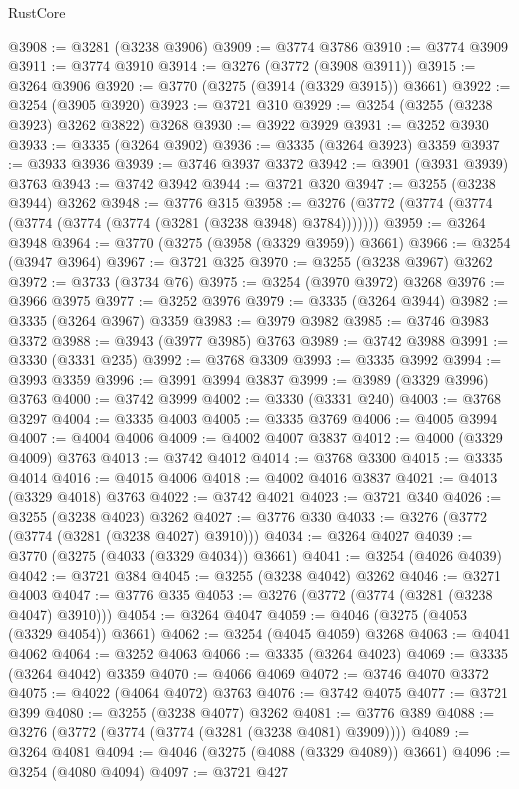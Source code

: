 \begin{lexlean}{RustCore}
\begin{coremodule}
@3908 := @3281 (@3238 @3906)
@3909 := @3774 @3786
@3910 := @3774 @3909
@3911 := @3774 @3910
@3914 := @3276 (@3772 (@3908 @3911))
@3915 := @3264 @3906
@3920 := @3770 (@3275 (@3914 (@3329 @3915)) @3661)
@3922 := @3254 (@3905 @3920)
@3923 := @3721 @310
@3929 := @3254 (@3255 (@3238 @3923) @3262 @3822) @3268
@3930 := @3922 @3929
@3931 := @3252 @3930
@3933 := @3335 (@3264 @3902)
@3936 := @3335 (@3264 @3923) @3359
@3937 := @3933 @3936
@3939 := @3746 @3937 @3372
@3942 := @3901 (@3931 @3939) @3763
@3943 := @3742 @3942
@3944 := @3721 @320
@3947 := @3255 (@3238 @3944) @3262
@3948 := @3776 @315
@3958 := @3276 (@3772 (@3774 (@3774 (@3774 (@3774 (@3774 (@3281 (@3238 @3948) @3784)))))))
@3959 := @3264 @3948
@3964 := @3770 (@3275 (@3958 (@3329 @3959)) @3661)
@3966 := @3254 (@3947 @3964)
@3967 := @3721 @325
@3970 := @3255 (@3238 @3967) @3262
@3972 := @3733 (@3734 @76)
@3975 := @3254 (@3970 @3972) @3268
@3976 := @3966 @3975
@3977 := @3252 @3976
@3979 := @3335 (@3264 @3944)
@3982 := @3335 (@3264 @3967) @3359
@3983 := @3979 @3982
@3985 := @3746 @3983 @3372
@3988 := @3943 (@3977 @3985) @3763
@3989 := @3742 @3988
@3991 := @3330 (@3331 @235)
@3992 := @3768 @3309
@3993 := @3335 @3992
@3994 := @3993 @3359
@3996 := @3991 @3994 @3837
@3999 := @3989 (@3329 @3996) @3763
@4000 := @3742 @3999
@4002 := @3330 (@3331 @240)
@4003 := @3768 @3297
@4004 := @3335 @4003
@4005 := @3335 @3769
@4006 := @4005 @3994
@4007 := @4004 @4006
@4009 := @4002 @4007 @3837
@4012 := @4000 (@3329 @4009) @3763
@4013 := @3742 @4012
@4014 := @3768 @3300
@4015 := @3335 @4014
@4016 := @4015 @4006
@4018 := @4002 @4016 @3837
@4021 := @4013 (@3329 @4018) @3763
@4022 := @3742 @4021
@4023 := @3721 @340
@4026 := @3255 (@3238 @4023) @3262
@4027 := @3776 @330
@4033 := @3276 (@3772 (@3774 (@3281 (@3238 @4027) @3910)))
@4034 := @3264 @4027
@4039 := @3770 (@3275 (@4033 (@3329 @4034)) @3661)
@4041 := @3254 (@4026 @4039)
@4042 := @3721 @384
@4045 := @3255 (@3238 @4042) @3262
@4046 := @3271 @4003
@4047 := @3776 @335
@4053 := @3276 (@3772 (@3774 (@3281 (@3238 @4047) @3910)))
@4054 := @3264 @4047
@4059 := @4046 (@3275 (@4053 (@3329 @4054)) @3661)
@4062 := @3254 (@4045 @4059) @3268
@4063 := @4041 @4062
@4064 := @3252 @4063
@4066 := @3335 (@3264 @4023)
@4069 := @3335 (@3264 @4042) @3359
@4070 := @4066 @4069
@4072 := @3746 @4070 @3372
@4075 := @4022 (@4064 @4072) @3763
@4076 := @3742 @4075
@4077 := @3721 @399
@4080 := @3255 (@3238 @4077) @3262
@4081 := @3776 @389
@4088 := @3276 (@3772 (@3774 (@3774 (@3281 (@3238 @4081) @3909))))
@4089 := @3264 @4081
@4094 := @4046 (@3275 (@4088 (@3329 @4089)) @3661)
@4096 := @3254 (@4080 @4094)
@4097 := @3721 @427

\end{coremodule}
\end{lexlean}
